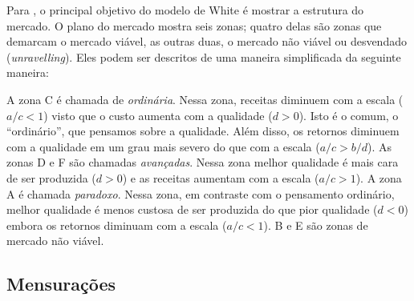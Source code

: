 \documentclass[a4paper, 12pt, openright, oneside, german, french, english, brazil]{abntex2}
\begin{document}
	
	Para , o principal objetivo do modelo de White é mostrar a estrutura do mercado. O plano do mercado mostra seis zonas; quatro delas são zonas que demarcam o mercado viável, as outras duas, o mercado não viável ou desvendado (\textit{unravelling}). Eles podem ser descritos de uma maneira simplificada da seguinte maneira:
	
	
	A zona C é chamada de \textit{ordinária}. Nessa zona, receitas diminuem com a escala ($a/c < 1$) visto que o custo aumenta com a qualidade ($d > 0$). Isto é o comum, o ``ordinário'', que pensamos sobre a qualidade. Além disso, os retornos diminuem com a qualidade em um grau mais severo do que com a escala ($a/c > b/d$). As zonas D e F são chamadas \textit{avançadas}. Nessa zona melhor qualidade é mais cara de ser produzida ($d > 0$) e as receitas aumentam com a escala ($a/c > 1$). A zona A é chamada \textit{paradoxo}. Nessa zona, em contraste com o pensamento ordinário, melhor qualidade é menos custosa de ser produzida do que pior qualidade ($d < 0$) embora os retornos diminuam com a escala ($a/c < 1$). B e E são zonas de mercado não viável.
	
	
	
	

	
	\subsection{Mensurações}
	
\end{document}

